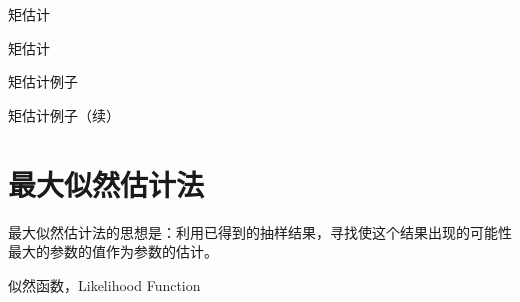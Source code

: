 
\begin{frame}

\begin{block}{矩估计}

\end{block}

\end{frame}


\begin{frame}

\begin{block}{矩估计}

\end{block}

\end{frame}


\begin{frame}

\begin{block}{矩估计例子}

\end{block}

\end{frame}


\begin{frame}

\begin{block}{矩估计例子（续）}

\end{block}

\end{frame}



\section{最大似然估计法}


\begin{frame}

最大似然估计法的思想是：利用已得到的抽样结果，寻找使这个结果出现的可能性最大的参数的值作为参数的估计。

\begin{block}{似然函数，Likelihood Function}

\end{block}

\end{frame}

